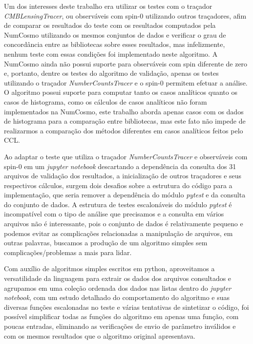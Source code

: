 Um dos interesses deste trabalho era utilizar os testes com o traçador \textit{CMBLensingTracer}, ou observáveis com spin-0 utilizando outros traçadores, afim de comparar os resultados do teste com os resultados computados pela NumCosmo utilizando os mesmos conjuntos de dados e verificar o grau de concordância entre as bibliotecas sobre esses resultados, mas infelizmente, nenhum teste com essas condições foi implementado neste algoritmo. A NumCosmo ainda não possui suporte para observáveis com spin diferente de zero e, portanto, dentre os testes do algoritmo de validação, apenas os testes utilizando o traçador  \textit{NumberCountsTracer} e o spin-0 permitem efetuar a análise. O algoritmo possui suporte para computar tanto os casos analíticos quanto os casos de histograma, como os cálculos de casos analíticos não foram implementados na NumCosmo, este trabalho aborda apenas casos com  os dados de histograma para a comparação entre bibliotecas, mas este fato não impede de realizarmos a comparação dos métodos diferentes em casos analíticos feitos pelo CCL.

Ao adaptar o teste que utiliza o traçador \textit{NumberCountsTracer} e observáveis com spin-0 em um \textit{jupyter notebook} descartando a dependência da consulta dos 31 arquivos de validação dos resultados, a inicialização de outros traçadores e seus respectivos cálculos, surgem dois desafios sobre a estrutura do código para a implementação, que seria remover a dependência do módulo \textit{pytest} e da consulta do conjunto de dados. A estrutura de testes escalonáveis do módulo \textit{pytest} é incompatível com o tipo de análise que precisamos e a consulta em vários arquivos não é interessante, pois o conjunto de dados é relativamente pequeno e podemos evitar as complicações relacionadas a manipulação de arquivos, em outras palavras, buscamos a produção de um algoritmo simples sem complicações/problemas a mais para lidar.

Com auxílio de algoritmos simples escritos em python, aproveitamos a versatilidade da linguagem para extrair os dados dos arquivos consultados e agrupamos em uma coleção ordenada dos dados nas listas dentro do \textit{jupyter notebook}, com um estudo detalhado do comportamento do algoritmo e suas diversas funções escalonadas no teste e várias tentativas de sintetizar o código, foi possível simplificar todas as funções do algoritmo em apenas uma função, com poucas entradas, eliminando as verificações de envio de parâmetro inválidos e com os mesmos resultados que o algoritmo original apresentava.

